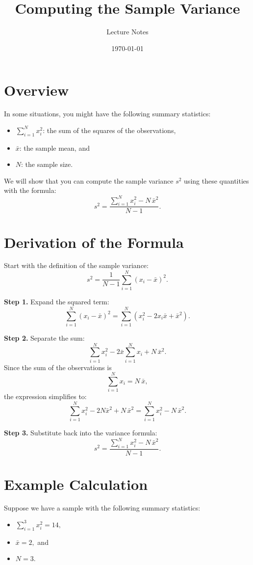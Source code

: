 \documentclass[12pt]{article}
\title{Computing the Sample Variance}
\author{Lecture Notes}
\date{\today}
\begin{document}


\section{Overview}
In some situations, you might have the following summary statistics:
\begin{itemize}
    \item \(\sum_{i=1}^{N} x_i^2\): the sum of the squares of the observations,
    \item \(\bar{x}\): the sample mean, and
    \item \(N\): the sample size.
\end{itemize}
We will show that you can compute the sample variance \(s^2\) using these quantities with the formula:
\[
s^2 = \frac{\sum_{i=1}^{N} x_i^2 - N\,\bar{x}^2}{N-1}.
\]


\section{Derivation of the Formula}
Start with the definition of the sample variance:
\[
s^2 = \frac{1}{N-1}\sum_{i=1}^{N} \left(x_i - \bar{x}\right)^2.
\]
\bigskip

\textbf{Step 1.} Expand the squared term:
\[
\sum_{i=1}^{N} \left(x_i - \bar{x}\right)^2 
= \sum_{i=1}^{N} \left(x_i^2 - 2x_i\bar{x} + \bar{x}^2\right).
\]
\bigskip

\textbf{Step 2.} Separate the sum:
\[
\sum_{i=1}^{N} x_i^2 - 2\bar{x}\sum_{i=1}^{N} x_i + N\,\bar{x}^2.
\]
Since the sum of the observations is
\[
\sum_{i=1}^{N} x_i = N\,\bar{x},
\]
the expression simplifies to:
\[
\sum_{i=1}^{N} x_i^2 - 2N\bar{x}^2 + N\,\bar{x}^2 
= \sum_{i=1}^{N} x_i^2 - N\,\bar{x}^2.
\]
\bigskip

\textbf{Step 3.} Substitute back into the variance formula:
\[
s^2 = \frac{\sum_{i=1}^{N} x_i^2 - N\,\bar{x}^2}{N-1}.
\]


\section{Example Calculation}
Suppose we have a sample with the following summary statistics:
\begin{itemize}
    \item \(\displaystyle \sum_{i=1}^{3} x_i^2 = 14,\)
    \item \(\bar{x} = 2,\) and
    \item \(N = 3.\)
\end{itemize}
\end{document}
